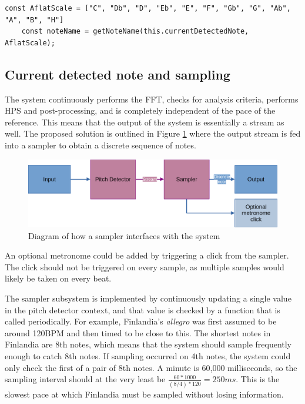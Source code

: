 \begin{lstlisting}[style=javascript, caption={Applying the correct flats and sharps based on the key of the current piece.}]
    const AflatScale = ["C", "Db", "D", "Eb", "E", "F", "Gb", "G", "Ab", "A", "B", "H"]
    const noteName = getNoteName(this.currentDetectedNote, AflatScale);
\end{lstlisting}

\subsection{Current detected note and sampling}
The system continuously performs the FFT, checks for analysis criteria, performs HPS and post-processing, and is completely independent of the pace of the reference. This means that the output of the system is essentially a stream as well. The proposed solution is outlined in Figure \ref{fig:samplerArch} where the output stream is fed into a sampler to obtain a discrete sequence of notes. 

\begin{figure}[ht]
    \centering
    \includegraphics[width=\textwidth]{./images/samplerArch.png}
    \caption{Diagram of how a sampler interfaces with the system\label{fig:samplerArch}}
\end{figure}

An optional metronome could be added by triggering a click from the sampler. The click should not be triggered on every sample, as multiple samples would likely be taken on every beat. 

The sampler subsystem is implemented by continuously updating a single value in the pitch detector context, and that value is checked by a function that is called periodically. For example, Finlandia's \textit{allegro} was first assumed to be around 120BPM and then timed to be close to this. The shortest notes in Finlandia are 8th notes, which means that the system should sample frequently enough to catch 8th notes. If sampling occurred on 4th notes, the system could only check the first of a pair of 8th notes. A minute is 60,000 milliseconds, so the sampling interval should at the very least be $\frac{60*1000}{(8/4)*120} = 250ms$. This is the slowest pace at which Finlandia must be sampled without losing information.

